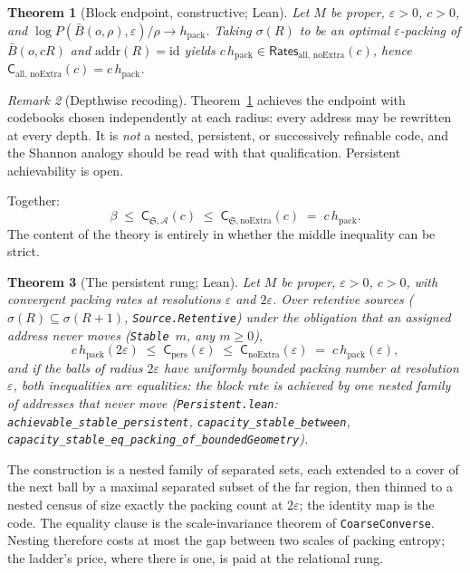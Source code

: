 \documentclass[11pt,a4paper]{article}
\theoremstyle{plain}
\newtheorem{theorem}{Theorem}
\theoremstyle{definition}
\theoremstyle{remark}
\newtheorem{remark}[theorem]{Remark}
\newcommand{\Rates}{\mathsf{Rates}}
\newcommand{\Capy}{\mathsf{C}}
\newcommand{\hpack}{h_{\mathrm{pack}}}
\begin{document}
\begin{theorem}[Block endpoint, constructive; Lean]\label{thm:block}
Let $M$ be proper, $\varepsilon>0$, $c>0$, and
$\log P(\bar B(o,\rho),\varepsilon)/\rho \to \hpack$. Taking
$\sigma(R)$ to be an optimal $\varepsilon$-packing of $\bar B(o,cR)$ and
$\mathrm{addr}(R)=\mathrm{id}$ yields
$c\,\hpack \in \Rates_{\mathrm{all},\,\mathrm{noExtra}}(c)$, hence
$\Capy_{\mathrm{all},\,\mathrm{noExtra}}(c) = c\,\hpack$.
\end{theorem}

\begin{remark}[Depthwise recoding]
Theorem~\ref{thm:block} achieves the endpoint with codebooks chosen
independently at each radius: every address may be rewritten at every depth.
It is \emph{not} a nested, persistent, or successively refinable code, and the
Shannon analogy should be read with that qualification. Persistent
achievability is open.
\end{remark}

Together:
\[
  \beta \;\le\; \Capy_{\mathfrak S,\mathcal A}(c) \;\le\;
  \Capy_{\mathfrak S,\mathrm{noExtra}}(c) \;=\; c\,\hpack .
\]
The content of the theory is entirely in whether the middle inequality can be
strict.

\begin{theorem}[The persistent rung; Lean]\label{thm:persistent}
Let $M$ be proper, $\varepsilon>0$, $c>0$, with convergent packing rates at
resolutions $\varepsilon$ and $2\varepsilon$. Over retentive sources
($\sigma(R)\subseteq\sigma(R{+}1)$, \texttt{Source.Retentive}) under the
obligation that an assigned address never moves (\texttt{Stable}~$m$, any
$m\ge0$),
\[
  c\,\hpack(2\varepsilon)\;\le\;\Capy_{\mathrm{pers}}(\varepsilon)
  \;\le\;\Capy_{\mathrm{noExtra}}(\varepsilon)\;=\;c\,\hpack(\varepsilon),
\]
and if the balls of radius $2\varepsilon$ have uniformly bounded packing number
at resolution $\varepsilon$, both inequalities are equalities: the block rate
is achieved by one nested family of addresses that never move
(\texttt{Persistent.lean}: \texttt{achievable\_\allowbreak{}stable\_\allowbreak{}persistent},
\texttt{capacity\_\allowbreak{}stable\_\allowbreak{}between},
\texttt{capacity\_\allowbreak{}stable\_\allowbreak{}eq\_\allowbreak{}packing\_\allowbreak{}of\_\allowbreak{}boundedGeometry}).
\end{theorem}

The construction is a nested family of separated sets, each extended to a
cover of the next ball by a maximal separated subset of the far region, then
thinned to a nested census of size exactly the packing count at $2\varepsilon$;
the identity map is the code. The equality clause is the scale-invariance
theorem of \texttt{CoarseConverse}. Nesting therefore costs at most the gap
between two scales of packing entropy; the ladder's price, where there is one,
is paid at the relational rung.
\end{document}
